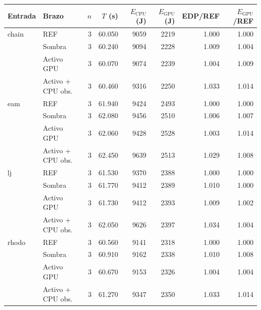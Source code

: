 \begin{tabular}{@{}llrrrrrr@{}}
\toprule
\textbf{Entrada} & \textbf{Brazo} & \textbf{$n$} & \textbf{$T$ (s)} & \textbf{$E_{\mathrm{CPU}}$ (J)} & \textbf{$E_{\mathrm{GPU}}$ (J)} & \textbf{EDP/REF} & \textbf{$E_{\mathrm{GPU}}$/REF} \\
\midrule
chain & REF & 3 & 60.050 & 9059 & 2219 & 1.000 & 1.000 \\
 & Sombra & 3 & 60.240 & 9094 & 2228 & 1.009 & 1.004 \\
 & Activo GPU & 3 & 60.070 & 9074 & 2239 & 1.004 & 1.009 \\
 & Activo + CPU obs. & 3 & 60.460 & 9316 & 2250 & 1.033 & 1.014 \\
\midrule
eam & REF & 3 & 61.940 & 9424 & 2493 & 1.000 & 1.000 \\
 & Sombra & 3 & 62.080 & 9456 & 2510 & 1.006 & 1.007 \\
 & Activo GPU & 3 & 62.060 & 9428 & 2528 & 1.003 & 1.014 \\
 & Activo + CPU obs. & 3 & 62.450 & 9639 & 2513 & 1.029 & 1.008 \\
\midrule
lj & REF & 3 & 61.530 & 9370 & 2388 & 1.000 & 1.000 \\
 & Sombra & 3 & 61.770 & 9412 & 2389 & 1.010 & 1.000 \\
 & Activo GPU & 3 & 61.730 & 9412 & 2393 & 1.009 & 1.002 \\
 & Activo + CPU obs. & 3 & 62.050 & 9626 & 2397 & 1.034 & 1.004 \\
\midrule
rhodo & REF & 3 & 60.560 & 9141 & 2318 & 1.000 & 1.000 \\
 & Sombra & 3 & 60.910 & 9162 & 2338 & 1.010 & 1.008 \\
 & Activo GPU & 3 & 60.670 & 9153 & 2326 & 1.004 & 1.004 \\
 & Activo + CPU obs. & 3 & 61.270 & 9347 & 2350 & 1.033 & 1.014 \\
\bottomrule
\end{tabular}
